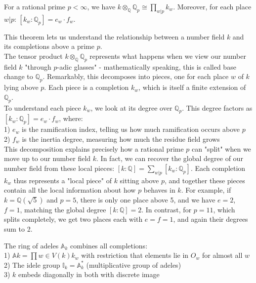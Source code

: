 \begin{outline}
\0 \begin{theorem}
    For a rational prime $p < \infty$, we have $k \otimes_{\mathbb{Q}} \mathbb{Q}_p \cong \prod_{w|p} k_w$. Moreover, for each place $w|p$: $[k_w : \mathbb{Q}_p] = e_w \cdot f_w$.  
\end{theorem}

\0 \begin{note}
    This theorem lets us understand the relationship between a number field $k$ and its completions above a prime $p$.\\
    The tensor product $k \otimes_{\mathbb{Q}} \mathbb{Q}_p$ represents what happens when we view our number field $k$ "through $p$-adic glasses" - mathematically speaking, this is called base change to $\mathbb{Q}_p$. Remarkably, this decomposes into pieces, one for each place $w$ of $k$ lying above $p$. Each piece is a completion $k_w$, which is itself a finite extension of $\mathbb{Q}_p$.\\
    To understand each piece $k_w$, we look at its degree over $\mathbb{Q}_p$. This degree factors as $[k_w : \mathbb{Q}_p] = e_w \cdot f_w$, where:\\
    1) $e_w$ is the ramification index, telling us how much ramification occurs above $p$ \\
    2) $f_w$ is the inertia degree, measuring how much the residue field grows\\
    This decomposition explains precisely how a rational prime $p$ can "split" when we move up to our number field $k$. In fact, we can recover the global degree of our number field from these local pieces: $[k : \mathbb{Q}] = \sum_{w|p} [k_w : \mathbb{Q}_p]$. Each completion $k_w$ thus represents a "local piece" of $k$ sitting above $p$, and together these pieces contain all the local information about how $p$ behaves in $k$.
    For example, if $k = \mathbb{Q}(\sqrt{5})$ and $p = 5$, there is only one place above 5, and we have $e = 2$, $f = 1$, matching the global degree $[k : \mathbb{Q}] = 2$. In contrast, for $p = 11$, which splits completely, we get two places each with $e = f = 1$, and again their degrees sum to 2.
\end{note}

\0 \begin{definition}
    The ring of adeles $\mathbb{A}_k$ combines all completions:\\ 
    1) $\mathbb{A}k = \prod{w \in V(k)} k_w$ with restriction that elements lie in $O_w$ for almost all $w$\\
    2) The idele group $\mathbb{I}_k = \mathbb{A}_k^*$ (multiplicative group of adeles)\\
    3) $k$ embeds diagonally in both with discrete image
\end{definition}
\end{outline}

